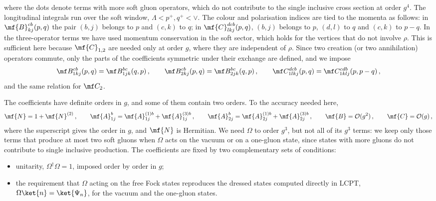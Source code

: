 where the dots denote terms with more soft gluon operators, which do not contribute to the single
inclusive cross section at order $g^{4}$. The longitudinal integrals run over the soft window,
$\Lambda<p^{+},q^{+}<\vee$. The colour and polarisation indices are tied to the momenta as follows: in
$\mf{B}^{cb}_{kj}(p,q)$ the pair $(b,j)$ belongs to $p$ and $(c,k)$ to $q$; in
$\mf{C}^{dcb}_{lkj}(p,q)$, $(b,j)$ belongs to $p$, $(d,l)$ to $q$ and $(c,k)$ to $p-q$. In the
three-operator terms we have used momentum conservation in the soft sector, which holds for the vertices
that do not involve $\rho$. This is sufficient here because $\mf{C}_{1,2}$ are needed only at order
$g$, where they are independent of $\rho$. Since two creation (or two annihilation) operators commute,
only the parts of the coefficients symmetric under their exchange are defined, and we impose
\begin{align}\label{eq:symm}
\mf B^{cb}_{1kj}(p,q)=\mf B^{bc}_{1jk}(q,p)\,,\qquad \mf B^{cb}_{2kj}(p,q)=\mf B^{bc}_{2jk}(q,p)\,,\qquad
\mf C^{dcb}_{1lkj}(p,q)=\mf C^{cdb}_{1klj}(p,p-q)\,,
\end{align}
and the same relation for $\mf C_{2}$.

The coefficients have definite orders in $g$, and some of them contain two orders. To the accuracy
needed here,
\begin{align}\label{eq:orders}
\mf{N}=1+\mf{N}^{(2)}\,,\qquad
\mf{A}^{b}_{1j}=\mf{A}^{(1)b}_{1j}+\mf{A}^{(3)b}_{1j}\,,\qquad
\mf{A}^{b}_{2j}=\mf{A}^{(1)b}_{2j}+\mf{A}^{(3)b}_{2j}\,,\qquad
\mf{B}=\mathcal{O}(g^{2})\,,\qquad \mf{C}=\mathcal{O}(g)\,,
\end{align}
where the superscript gives the order in $g$, and $\mf{N}$ is Hermitian. We need $\Omega$ to order
$g^{3}$, but not all of its $g^{3}$ terms: we keep only those terms that produce at most two soft
gluons when $\Omega$ acts on the vacuum or on a one-gluon state, since states with more gluons do not
contribute to single inclusive production. The coefficients are fixed by two complementary sets of
conditions:
\begin{itemize}
\item unitarity, $\Omega^{\dagger}\Omega=1$, imposed order by order in $g$;
\item the requirement that $\Omega$ acting on the free Fock states reproduces the dressed states
computed directly in LCPT, $\Omega\ket{n}=\ket{\Psi_{n}}$, for the vacuum and the one-gluon states.
\end{itemize}

